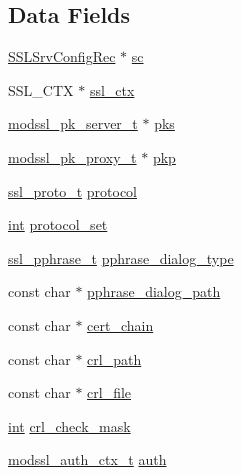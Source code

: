 \subsection*{Data Fields}
\begin{DoxyCompactItemize}
\item 
\hyperlink{structSSLSrvConfigRec}{S\+S\+L\+Srv\+Config\+Rec} $\ast$ \hyperlink{structmodssl__ctx__t_a342be3370921b6346e4d3e6714f00105}{sc}
\item 
S\+S\+L\+\_\+\+C\+TX $\ast$ \hyperlink{structmodssl__ctx__t_a55d4073e2040508eaf1994518c37a58f}{ssl\+\_\+ctx}
\item 
\hyperlink{structmodssl__pk__server__t}{modssl\+\_\+pk\+\_\+server\+\_\+t} $\ast$ \hyperlink{structmodssl__ctx__t_ad3ccaab1e3c37050d9eecc3c830d7a89}{pks}
\item 
\hyperlink{structmodssl__pk__proxy__t}{modssl\+\_\+pk\+\_\+proxy\+\_\+t} $\ast$ \hyperlink{structmodssl__ctx__t_acb20829f01057f58d94469af712880c2}{pkp}
\item 
\hyperlink{group__MOD__SSL__PRIVATE_ga5139e7dd6af8f34cd9cf51b9c35312f1}{ssl\+\_\+proto\+\_\+t} \hyperlink{structmodssl__ctx__t_a2db939a3ce5333fe554908a69bb971e4}{protocol}
\item 
\hyperlink{pcre_8txt_a42dfa4ff673c82d8efe7144098fbc198}{int} \hyperlink{structmodssl__ctx__t_a6b5bcd5e155bb9b911a49ca51aaa3848}{protocol\+\_\+set}
\item 
\hyperlink{group__MOD__SSL__PRIVATE_gad9be8a03d6bba7c92cf27a00ab9f7971}{ssl\+\_\+pphrase\+\_\+t} \hyperlink{structmodssl__ctx__t_a1fe0b0fdd63583304dae0dfd85982771}{pphrase\+\_\+dialog\+\_\+type}
\item 
const char $\ast$ \hyperlink{structmodssl__ctx__t_aa49d72ee17088961d6e84bac67c99b47}{pphrase\+\_\+dialog\+\_\+path}
\item 
const char $\ast$ \hyperlink{structmodssl__ctx__t_aede065cc587a381263720e0dd56e8cdf}{cert\+\_\+chain}
\item 
const char $\ast$ \hyperlink{structmodssl__ctx__t_a82c0a7891d513833c7a6b2dffcd027d3}{crl\+\_\+path}
\item 
const char $\ast$ \hyperlink{structmodssl__ctx__t_ae18c8b63124ec75a6764e0cfcfde8fa7}{crl\+\_\+file}
\item 
\hyperlink{pcre_8txt_a42dfa4ff673c82d8efe7144098fbc198}{int} \hyperlink{structmodssl__ctx__t_a0951fd82c695f7083019c281a8ac9273}{crl\+\_\+check\+\_\+mask}
\item 
\hyperlink{structmodssl__auth__ctx__t}{modssl\+\_\+auth\+\_\+ctx\+\_\+t} \hyperlink{structmodssl__ctx__t_a55144723f90510fb094554f7652f0ef0}{auth}

\end{DoxyCompactItemize}
